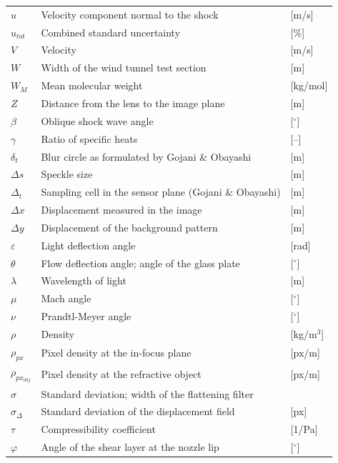 \begin{longtable}{p{2.5cm}p{8cm}p{2.5cm}}
    $u$ & Velocity component normal to the shock & [m/s] \\
    $u_{tot}$ & Combined standard uncertainty & [\%] \\
    $V$ & Velocity & [m/s] \\
    $W$ & Width of the wind tunnel test section & [m] \\
    $W_M$ & Mean molecular weight & [kg/mol] \\
    $Z$ & Distance from the lens to the image plane & [m] \\
    \midrule %
    $\beta$ & Oblique shock wave angle & [$^{\circ}$] \\
    $\gamma$ & Ratio of specific heats & [--] \\
    $\delta_t$ & Blur circle as formulated by Gojani \& Obayashi & [m] \\
    $\Delta s$ & Speckle size & [m] \\
    $\Delta_t$ & Sampling cell in the sensor plane (Gojani \& Obayashi) & [m] \\
    $\Delta x$ & Displacement measured in the image & [m] \\
    $\Delta y$ & Displacement of the background pattern & [m] \\
    $\varepsilon$ & Light deflection angle & [rad] \\
    $\theta$ & Flow deflection angle; angle of the glass plate & [$^{\circ}$] \\
    $\lambda$ & Wavelength of light & [m] \\
    $\mu$ & Mach angle & [$^{\circ}$] \\
    $\nu$ & Prandtl-Meyer angle & [$^{\circ}$] \\
    $\rho$ & Density & [kg/m$^3$] \\
    $\rho_{px}$ & Pixel density at the in-focus plane & [px/m] \\
    $\rho_{px_{obj}}$ & Pixel density at the refractive object & [px/m] \\
    $\sigma$ & Standard deviation; width of the flattening filter & \\
    $\sigma_\Delta$ & Standard deviation of the displacement field & [px] \\
    $\tau$ & Compressibility coefficient & [1/Pa] \\
    $\varphi$ & Angle of the shear layer at the nozzle lip & [$^{\circ}$] \\
    \bottomrule
\end{longtable}
